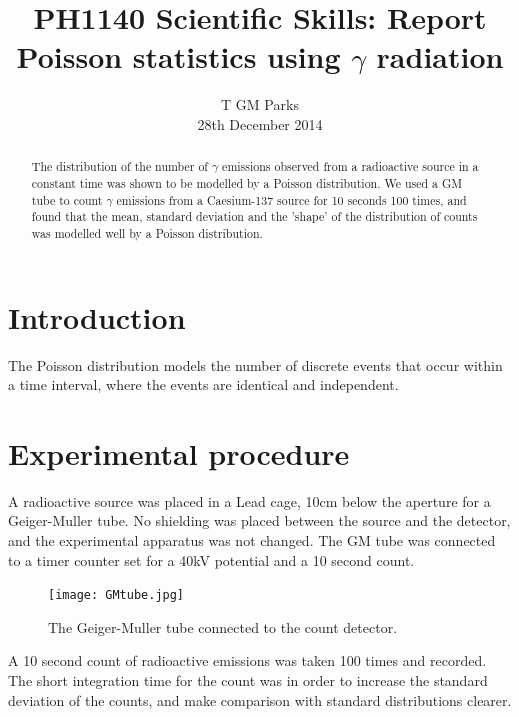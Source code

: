 \documentclass[10pt]{iopart}
\begin{document}
\title[PH1140 Report - T GM Parks]{PH1140 Scientific Skills: Report Poisson statistics using $\gamma$ radiation}

\author{T GM Parks\\28th December 2014}

\begin{abstract}
The distribution of the number of $\gamma$ emissions observed from a radioactive source in a constant time was shown to be modelled by a Poisson distribution. We used a GM tube to count $\gamma$ emissions from a Caesium-137 source for 10 seconds 100 times, and found that the mean, standard deviation and the 'shape' of the distribution of counts was modelled well by a Poisson distribution.
\end{abstract}


\section{Introduction}

The Poisson distribution models the number of discrete events that occur within a time interval, where the events are identical and independent. \cite{mathworld}
\section{Experimental procedure}

A radioactive source was placed in a Lead cage, 10cm below the aperture for a Geiger-Muller tube. No shielding was placed between the source and the detector, and the experimental apparatus was not changed. The GM tube was connected to a timer counter set for a 40kV potential and a 10 second count.
\begin{figure}[htbp]
\begin{center}
\texttt{[image: GMtube.jpg]}
\caption{The Geiger-Muller tube connected to the count detector.}
\label{default}
\end{center}
\end{figure}

A 10 second count of radioactive emissions was taken 100 times and recorded. The short integration time for the count was in order to increase the standard deviation of the counts, and make comparison with standard distributions clearer.
\end{document}
